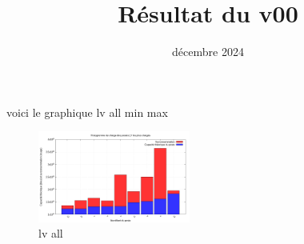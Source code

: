 \documentclass{article}
\title{Résultat du v00}
\date{décembre 2024}
\begin{document}
\maketitle

voici le graphique lv all min max
\begin{figure}
    \begin{center}
        \includegraphics[width = 5cm]{./v00/lv_all_minmax_overload.png}
    \end{center}
    \caption{lv all}
\end{figure}
\end{document}
